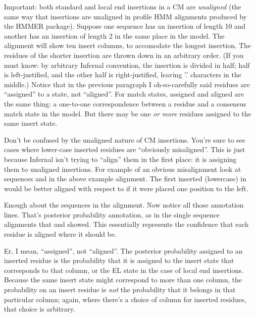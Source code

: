 Important: both standard and local end insertions in a CM are
\emph{unaligned} (the same way that insertions are unaligned in
profile HMM alignments produced by the HMMER package). Suppose one
sequence has an insertion of length 10 and another has an insertion of
length 2 in the same place in the model. The alignment will show ten
insert columns, to accomodate the longest insertion.  The residues of
the shorter insertion are thrown down in an arbitrary order. (If you
must know: by arbitrary Infernal convention, the insertion is divided
in half; half is left-justified, and the other half is
right-justified, leaving '.' characters in the middle.)  Notice that
in the previous paragraph I oh-so-carefully said residues are
``assigned'' to a state, not ``aligned''. For match states, assigned
and aligned are the same thing: a one-to-one correspondence between a
residue and a consensus match state in the model. But there may be one
\emph{or more} residues assigned to the same insert state.

Don't be confused by the unaligned nature of CM insertions. You're
sure to see cases where lower-case inserted residues are ``obviously
misaligned''. This is just because Infernal isn't trying to ``align''
them in the first place: it is assigning them to unaligned
insertions. For example of an obvious misalignment look at sequences
 and  in the above example
alignment. The first inserted (lowercase)  in
 would be better aligned with respect to
 if it were placed one position to the left.

Enough about the sequences in the alignment. Now notice all those
 annotation lines. That's posterior probability annotation,
as in the single sequence alignments that  and
 showed. This essentially represents the confidence
that each residue is aligned where it should be. 

Er, I mean, ``assigned'', not ``aligned''. The posterior probability
assigned to an inserted residue is the probability that it is assigned
to the insert state that corresponds to that column, or the EL state
in the case of local end insertions. Because the same insert state
might correspond to more than one column, the probability on an insert
residue is \emph{not} the probability that it belongs in that
particular column; again, where there's a choice of column for
inserted residues, that choice is arbitrary. 

